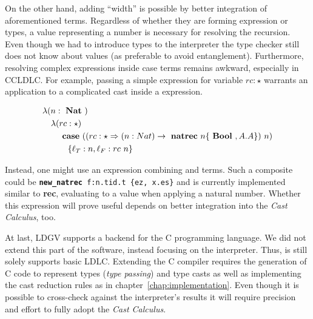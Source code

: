 On the other hand, adding ``width'' is possible by better integration of aforementioned \rec terms. Regardless of whether they are forming expression or types, a value representing a number is necessary for resolving the recursion. Even though we had to introduce types to the interpreter the type checker still does not know about values (as preferable to avoid entanglement). Furthermore, resolving complex expressions inside case terms remains awkward, especially in CCLDLC. For example, passing a simple \rec expression for variable $rc : \star$ warrants an application to a complicated cast inside a \case expression.

\begin{equation}
\begin{split}
&\lambda (n:\text{ \textbf{Nat} }) \\
&\quad\lambda (rc: \star) \\
&\qquad\text{ \textbf{case} } ((rc : \star \Rightarrow (n:Nat) \rightarrow \text{ \textbf{natrec} } n \{\text{ \textbf{Bool} }, A.A\} )~n) \\
&\quad\qquad \{\ell_T: n, \ell_F: rc~n\}
\end{split}
\end{equation}

Instead, one might use an expression combining \rec and \natrec terms. Such a composite could be \texttt{\textbf{new\_natrec} f:n.tid.t \{ez, x.es\}} and is currently implemented similar to \textbf{rec}, evaluating to a value when applying a natural number. Whether this expression will prove useful depends on better integration into the \emph{Cast Calculus}, too.

At last, LDGV supports a backend for the C programming language. We did not extend this part of the software, instead focusing on the interpreter. Thus, is still solely supports basic LDLC. Extending the C compiler requires the generation of C code to represent types (\emph{type passing}) and type casts as well as implementing the cast reduction rules as in chapter~\ref{chap:implementation}. Even though it is possible to cross-check against the interpreter's results it will require precision and effort to fully adopt the \emph{Cast Calculus}.